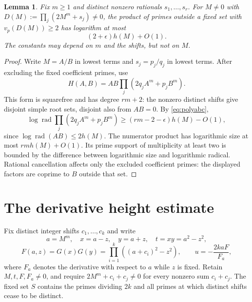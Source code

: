 \documentclass[11pt,a4paper]{article}
\newtheorem{lemma}[theorem]{Lemma}
\DeclareMathOperator{\rad}{rad}\DeclareMathOperator{\Tr}{Tr}
\begin{document}
\begin{lemma}\label{lem:power-multiple}
Fix $m\ge1$ and distinct nonzero rationals $s_1,\ldots,s_r$.
For $M\ne0$ with $D(M):=\prod_j(2M^m+s_j)\ne0$, the product
of primes outside a fixed set with $v_p(D(M))\ge2$ has logarithm
at most
\[
                         (2+\epsilon)h(M)+O(1).
\]
The constants may depend on $m$ and the shifts, but not on $M$.
\end{lemma}
\begin{proof}
Write $M=A/B$ in lowest terms and $s_j=p_j/q_j$ in lowest terms.
After excluding the fixed coefficient primes, use
\[
 H(A,B)=AB\prod_j(2q_jA^m+p_jB^m).
\]
This form is squarefree and has degree $rm+2$: the nonzero distinct
shifts give disjoint simple root sets, disjoint also from $AB=0$.
By \eqref{eq:polyabc},
\[
 \log\rad\prod_j(2q_jA^m+p_jB^m)
              \ge(rm-2-\epsilon)h(M)-O(1),
\]
since $\log\rad(AB)\le2h(M)$.
The numerator product has logarithmic size at most $rm h(M)+O(1)$.
Its prime support of multiplicity at least two is bounded by the
difference between logarithmic size and logarithmic radical.
Rational cancellation affects only the excluded coefficient primes:
the displayed factors are coprime to $B$ outside that set.
\end{proof}

\section{The derivative height estimate}

Fix distinct integer shifts $c_1,\ldots,c_k$ and write
\[
 a=M^m,\quad x=a-z,\quad y=a+z,\quad t=xy=a^2-z^2,
\]
\[
 F(a,z)=G(x)G(y)=\prod_{i=1}^k((a+c_i)^2-z^2),\qquad
                         u=-\frac{2kaF}{F_a},
\]
where $F_a$ denotes the derivative with respect to $a$ while $z$ is
fixed. Retain $M,t,F,F_a\ne0$, and require
$2M^m+c_i+c_j\ne0$ for every nonzero sum $c_i+c_j$.
The fixed set $S$ contains the primes dividing $2k$ and
all primes at which distinct shifts cease to be distinct.
\end{document}
